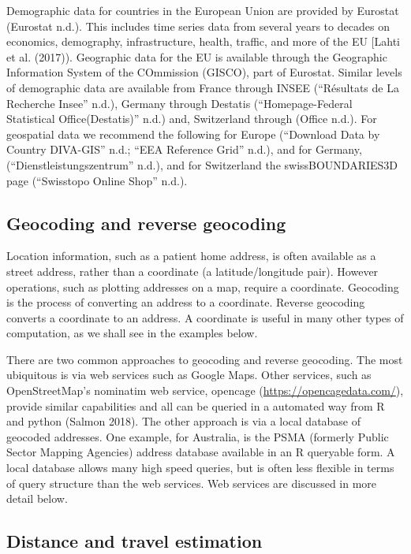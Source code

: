 \documentclass[]{article}
\begin{document}
Demographic data for countries in the European Union are provided by
Eurostat (Eurostat n.d.). This includes time series data from several
years to decades on economics, demography, infrastructure, health,
traffic, and more of the EU {[}Lahti et al. (2017)). Geographic data for
the EU is available through the Geographic Information System of the
COmmission (GISCO), part of Eurostat. Similar levels of demographic data
are available from France through INSEE (``Résultats de La Recherche
Insee'' n.d.), Germany through Destatis (``Homepage-Federal Statistical
Office(Destatis)'' n.d.) and, Switzerland through (Office n.d.). For
geospatial data we recommend the following for Europe (``Download Data
by Country DIVA-GIS'' n.d.; ``EEA Reference Grid'' n.d.), and for
Germany, (``Dienstleistungszentrum'' n.d.), and for Switzerland the
swissBOUNDARIES3D page (``Swisstopo Online Shop'' n.d.).

\hypertarget{geocoding-and-reverse-geocoding}{%
\subsection{Geocoding and reverse
geocoding}\label{geocoding-and-reverse-geocoding}}

Location information, such as a patient home address, is often available
as a street address, rather than a coordinate (a latitude/longitude
pair). However operations, such as plotting addresses on a map, require
a coordinate. Geocoding is the process of converting an address to a
coordinate. Reverse geocoding converts a coordinate to an address. A
coordinate is useful in many other types of computation, as we shall see
in the examples below.

There are two common approaches to geocoding and reverse geocoding. The
most ubiquitous is via web services such as Google Maps. Other services,
such as OpenStreetMap's nominatim web service, opencage
(\url{https://opencagedata.com/}), provide similar capabilities and all
can be queried in a automated way from R and python (Salmon 2018). The
other approach is via a local database of geocoded addresses. One
example, for Australia, is the PSMA (formerly Public Sector Mapping
Agencies) address database available in an R queryable form. A local
database allows many high speed queries, but is often less flexible in
terms of query structure than the web services. Web services are
discussed in more detail below.

\hypertarget{distance-and-travel-estimation}{%
\subsection{Distance and travel
estimation}\label{distance-and-travel-estimation}}
\end{document}
